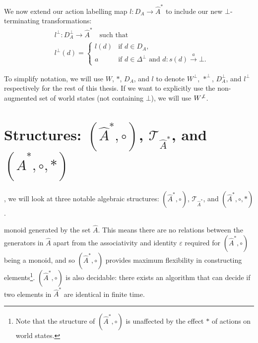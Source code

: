 We now extend our action labelling map $l: D_{A} \to \hat{A}^{*}$ to include our new $\bot$-terminating transformations:
\begin{align}
	 & l^{\bot} : D_{A}^{\bot} \to \hat{A}^{*} \quad\text{such that} \\
	 & l^{\bot}(d) =
	\begin{cases}
		l(d) & \text{if $d \in D_{A}$}, \\
		a    & \text{if $d \in \Delta^{\bot}$ and $d: s(d) \xrightarrow{a} \bot$.}
	\end{cases}
\end{align}

\begin{notation}
    To simplify notation, we will use $W$, $\ast$, $D_{A}$, and $l$ to denote $W^{\bot}$, $\ast^{\bot}$, $D_{A}^{\bot}$, and $l^{\bot}$ respectively for the rest of this thesis.
    If we want to explicitly use the non-augmented set of world states (not containing $\bot$), we will use $W^{\centernot\bot}$.
\end{notation}


\section{
Structures\texorpdfstring{: $(\hat{A}^{*}, \circ)$, $\mathcal{T}_{\hat{A}^{*}}$, and $(\hat{A}^{*}, \circ, \ast)$}{}
}

, we will look at three notable algebraic structures: $(\hat{A}^{*}, \circ)$, $\mathcal{T}_{\hat{A}^{*}}$, and $(\hat{A}^{*}, \circ, \ast)$.

 monoid generated by the set $\hat{A}$.
This means there are no relations between the generators in $\hat{A}$ apart from the associativity and identity $\varepsilon$ required for $(\hat{A}^{*}, \circ)$ being a monoid, and so $(\hat{A}^{*}, \circ)$ provides maximum flexibility in constructing elements\footnote{
Note that the structure of $(\hat{A}^{*}, \circ)$ is unaffected by the effect $\ast$ of actions on world states.
}.
$(\hat{A}^{*}, \circ)$ is also decidable: there exists an algorithm that can decide if two elements in $\hat{A}^{*}$ are identical in finite time.


